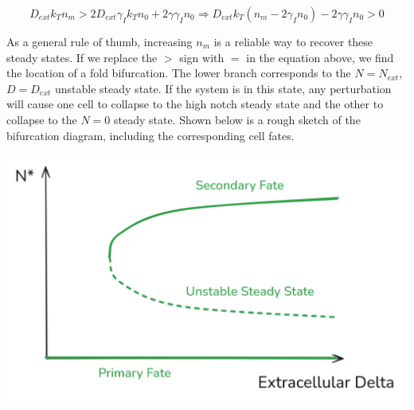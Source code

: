 \documentclass{article}
\begin{document}
\begin{flushleft}
$$D_{ext}k_{T}n_{m} > 2D_{ext}\gamma_{I}k_{T}n_{0} + 2\gamma \gamma_{I} n_{0} \Rightarrow D_{ext}k_{T}(n_{m} - 2\gamma_{I}n_{0}) - 2\gamma \gamma_{I} n_{0} > 0$$

As a general rule of thumb, increasing $n_{m}$ is a reliable way to recover these steady states. If we replace the $>$ sign with $=$ in the equation above, we find the location of a fold bifurcation. The lower branch corresponds to the $N = N_{ext}$, $D = D_{ext}$ unstable steady state. If the system is in this state, any perturbation will cause one cell to collapse to the high notch steady state and the other to collapse to the $N = 0$ steady state. Shown below is a rough sketch of the bifurcation diagram, including the corresponding cell fates.

\includegraphics[width=\textwidth]{bifurcation-diagram}

\end{flushleft}
\end{document}
